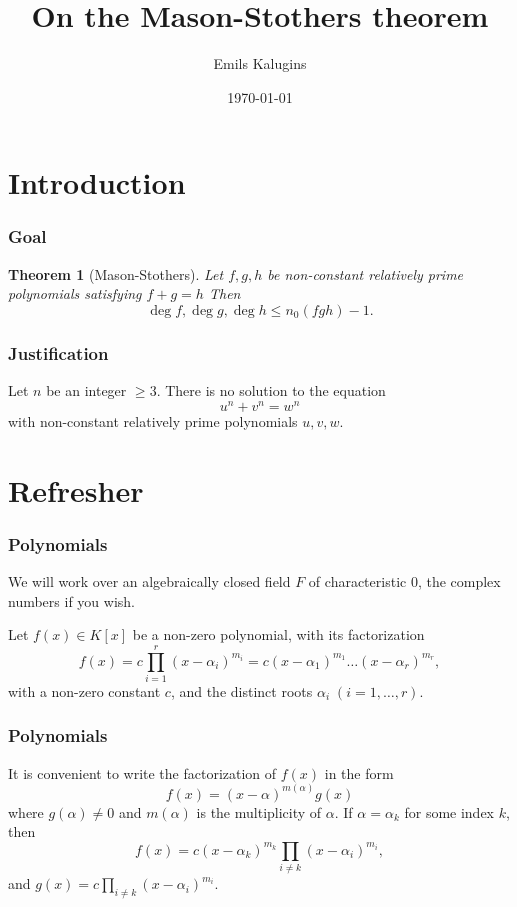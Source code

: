 \documentclass[envcountsect]{beamer}
\author{Emils Kalugins}
\title{On the Mason-Stothers theorem}
\institute{University of Latvia}
\date{\today}
\newtheorem*{theorem*}{Theorem}
\begin{document}
\begin{frame}
\maketitle

\end{frame}

\section{Introduction}

\begin{frame}
\frametitle{Goal}

\begin{theorem*}[Mason-Stothers]
Let $f,g,h$ be non-constant relatively prime polynomials satisfying $f+g=h$
Then \[\operatorname{deg}f, \operatorname{deg}g, \operatorname{deg}h \leq
  n_0(fgh) -1.\]
\end{theorem*}
\end{frame}

\begin{frame}
\frametitle{Justification}
\begin{theorem}
Let $n$ be an integer $\geq 3.$ There is no solution to the equation \[u^n +
  v^n = w^n\] with non-constant relatively prime polynomials $u,v,w$. 
\end{theorem}

\end{frame}

\section{Refresher}
\begin{frame}
\frametitle{Polynomials}
We will work over an algebraically closed field $F$ of characteristic 0, the complex
numbers if you wish.

Let $f(x) \in K[x]$ be a non-zero polynomial, with its factorization
\begin{equation} \label{eq:fac}
  f(x) = c\prod_{i=1}^r(x-\alpha_i)^{m_i}=c(x-\alpha_1)^{m_{1}} \dots (x-\alpha_r)^{m_r},
\end{equation}
with a non-zero constant $c$, and the distinct roots $\alpha_i \; (i=1,\dots,r).$
\end{frame}

\begin{frame}
\frametitle{Polynomials}

It is convenient to write the factorization of $f(x)$ in the form
\[
  f(x) = (x-\alpha)^{m(\alpha)}g(x)
\]
where \( g ( \alpha ) \neq 0 \) and $ m ( \alpha ) $ is the
multiplicity of $\alpha$. If $ \alpha = \alpha_k $ for some index $k$, then
\[
f(x) = c(x- \alpha_k )^{m_k}\prod_{i \neq k}(x-\alpha_i)^{m_i},
\]
and $g(x) = c\prod\limits_{i \neq k}(x-\alpha_i)^{m_i}$.


\end{frame}
\end{document}
